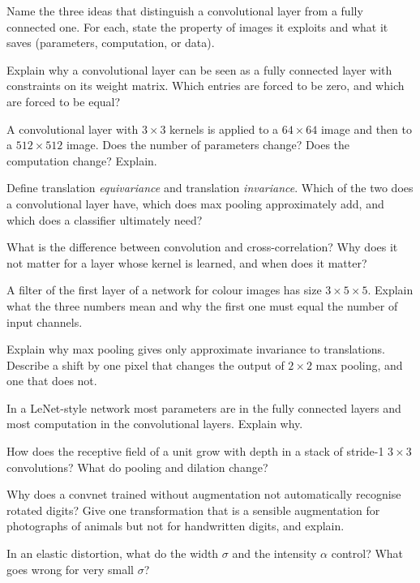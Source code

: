 \documentclass[11pt]{article}
\begin{document}
\begin{questions}
\begin{conceptual}
\item Name the three ideas that distinguish a convolutional layer from a fully connected one. For each, state the
  property of images it exploits and what it saves (parameters, computation, or data).
\item Explain why a convolutional layer can be seen as a fully connected layer with constraints on its weight matrix.
  Which entries are forced to be zero, and which are forced to be equal?
\item A convolutional layer with $3 \times 3$ kernels is applied to a $64 \times 64$ image and then to a $512 \times 512$
  image. Does the number of parameters change? Does the computation change? Explain.
\item Define translation \emph{equivariance} and translation \emph{invariance}. Which of the two does a convolutional layer
  have, which does max pooling approximately add, and which does a classifier ultimately need?
\item What is the difference between convolution and cross-correlation? Why does it not matter for a layer whose kernel
  is learned, and when does it matter?
\item A filter of the first layer of a network for colour images has size $3 \times 5 \times 5$. Explain what the three
  numbers mean and why the first one must equal the number of input channels.
\item Explain why max pooling gives only approximate invariance to translations. Describe a shift by one pixel that
  changes the output of $2 \times 2$ max pooling, and one that does not.
\item In a LeNet-style network most parameters are in the fully connected layers and most computation in the
  convolutional layers. Explain why.
\item How does the receptive field of a unit grow with depth in a stack of stride-1 $3 \times 3$ convolutions? What do
  pooling and dilation change?
\item Why does a convnet trained without augmentation not automatically recognise rotated digits? Give one
  transformation that is a sensible augmentation for photographs of animals but not for handwritten digits, and explain.
\item In an elastic distortion, what do the width $\sigma$ and the intensity $\alpha$ control? What goes wrong for very
  small $\sigma$?

\end{conceptual}
\end{questions}
\end{document}

